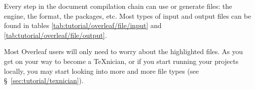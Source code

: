 Every step in the document compilation chain can use or generate files: the engine, the format, the \glspl{package}, etc. Most types of input and output files can be found in tables \ref{tab:tutorial/overleaf/file/input} and \ref{tab:tutorial/overleaf/file/output}.

Most Overleaf users will only need to worry about the highlighted files. As you get on your way to become a \TeX{}nician, or if you start running your projects locally, you may start looking into more and more file types (see \S~\ref{sec:tutorial/texnician}).

\begingroup
    \setlength{\columnA}{\dimexpr .16\linewidth}
    \setlength{\columnB}{\dimexpr .16\linewidth}
    \setlength{\columnC}{\dimexpr \linewidth-\columnA-\columnB}
    
    \setlength{\columnA}{\columnA-2\tabcolsep-4\vbar/3}
    \setlength{\columnB}{\columnB-2\tabcolsep-4\vbar/3}
    \setlength{\columnC}{\columnC-2\tabcolsep-4\vbar/3}
    
